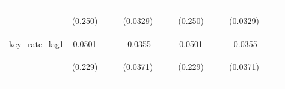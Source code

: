 \documentclass[]{article}
\begin{document}
\begin{center}
\begin{tabular}{lcccccccccccc}
\vspace{4pt} & \begin{footnotesize}(0.250)\end{footnotesize} & \begin{footnotesize}\end{footnotesize} & \begin{footnotesize}\end{footnotesize} & \begin{footnotesize}(0.0329)\end{footnotesize} & \begin{footnotesize}\end{footnotesize} & \begin{footnotesize}\end{footnotesize} & \begin{footnotesize}(0.250)\end{footnotesize} & \begin{footnotesize}\end{footnotesize} & \begin{footnotesize}\end{footnotesize} & \begin{footnotesize}(0.0329)\end{footnotesize} & \begin{footnotesize}\end{footnotesize} & \begin{footnotesize}\end{footnotesize} \\
key\_rate\_lag1 & 0.0501 &  &  & -0.0355 &  &  & 0.0501 &  &  & -0.0355 &  &  \\
\vspace{4pt} & \begin{footnotesize}(0.229)\end{footnotesize} & \begin{footnotesize}\end{footnotesize} & \begin{footnotesize}\end{footnotesize} & \begin{footnotesize}(0.0371)\end{footnotesize} & \begin{footnotesize}\end{footnotesize} & \begin{footnotesize}\end{footnotesize} & \begin{footnotesize}(0.229)\end{footnotesize} & \begin{footnotesize}\end{footnotesize} & \begin{footnotesize}\end{footnotesize} & \begin{footnotesize}(0.0371)\end{footnotesize} & \begin{footnotesize}\end{footnotesize} & \begin{footnotesize}\end{footnotesize} \\

\end{tabular}
\end{center}
\end{document}
